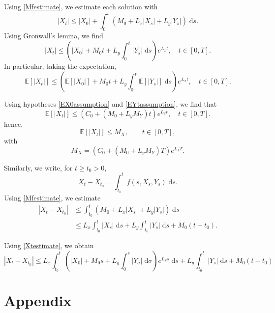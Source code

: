 \documentclass[reqno,12pt]{amsart}
\theoremstyle{plain}%
\theoremstyle{definition}
\begin{document}
Using \eqref{Mfestimate}, we estimate each solution with
$$
    |X_t|  \leq |X_0| + \int_0^t (M_0 + L_x |X_s| + L_y |Y_s|) \;\mathrm{d}s.
$$
Using Gronwall's lemma, we find
\begin{equation}
    \label{Xtestimate}
    |X_t| \leq \left( |X_0| + M_0 t  + L_y \int_0^t |Y_s| \;\mathrm{d}s\right) e^{L_x t}, \quad t \in [0, T].
\end{equation}
In particular, taking the expectation, 
$$
    \mathbb{E}[|X_t|] \leq \left( \mathbb{E}[|X_0|] + M_0 t  + L_y \int_0^t \mathbb{E}[|Y_s|] \;\mathrm{d}s\right) e^{L_x t}, \quad t \in [0, T].
$$

Using hypotheses \eqref{EX0assumption} and \eqref{EYtassumption}, we find that
$$
\mathbb{E}[|X_t|] \leq \left( C_0 + (M_0 + L_y M_Y) t \right) e^{L_x t}, \quad t \in [0, T].
$$
hence,
\begin{equation}
    \label{EXtestimate}
    \mathbb{E}[|X_t|] \leq M_X, \qquad t \in [0, T],
\end{equation}
with
\begin{equation}
    \label{MXt}
    M_X = (C_0 + (M_0 + L_y M_Y)T)e^{L_x T}.
\end{equation}


Similarly, we write, for $t \geq t_0 > 0$,
$$
X_t - X_{t_0} = \int_{t_0}^t f(s, X_s, Y_s) \;\mathrm{d}s.
$$
Using \eqref{Mfestimate}, we estimate
\begin{align*}
    |X_t - X_{t_0}| & \leq \int_{t_0}^t \left(M_0 + L_x |X_s| + L_y|Y_s| \right)\;\mathrm{d}s \\
    & \leq L_x \int_{t_0}^t |X_s| \;\mathrm{d}s + L_y\int_{t_0}^t |Y_s|\;\mathrm{d}s + M_0(t - t_0).
\end{align*}

Using \eqref{Xtestimate}, we obtain
\begin{equation}
    |X_t - X_{t_0}| \leq L_x \int_{t_0}^t \left( |X_0| + M_0 s  + L_y \int_0^s |Y_\sigma| \;\mathrm{d}\sigma\right) e^{L_x s} \;\mathrm{d}s + L_y\int_{t_0}^t |Y_s|\;\mathrm{d}s + M_0(t - t_0)
\end{equation}

\section*{Appendix}
\end{document}
